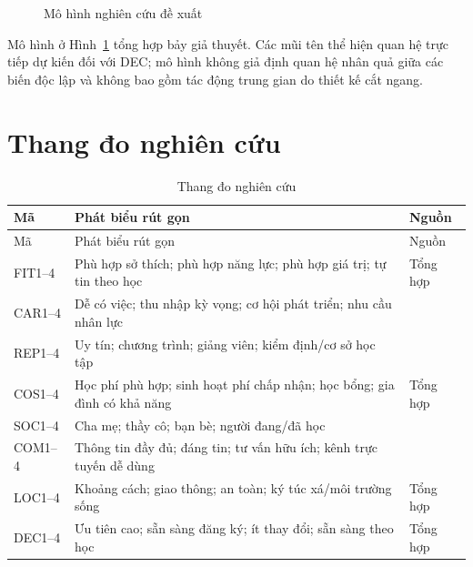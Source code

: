 \begin{figure}[H]\centering
{}
\caption{Mô hình nghiên cứu đề xuất}\label{fig:model}
\end{figure}

Mô hình ở Hình~\ref{fig:model} tổng hợp bảy giả thuyết. Các mũi tên thể hiện quan hệ trực tiếp dự kiến đối với DEC; mô hình không giả định quan hệ nhân quả giữa các biến độc lập và không bao gồm tác động trung gian do thiết kế cắt ngang.

\section{Thang đo nghiên cứu}
\begin{longtable}{p{1.5cm}p{9.3cm}p{2cm}}
\caption{Thang đo nghiên cứu}\label{tab:scale}\\\toprule Mã & Phát biểu rút gọn & Nguồn\\\midrule\endfirsthead
\toprule Mã & Phát biểu rút gọn & Nguồn\\\midrule\endhead
FIT1--4 & Phù hợp sở thích; phù hợp năng lực; phù hợp giá trị; tự tin theo học & Tổng hợp\\
CAR1--4 & Dễ có việc; thu nhập kỳ vọng; cơ hội phát triển; nhu cầu nhân lực & \citealp{becker1993}\\
REP1--4 & Uy tín; chương trình; giảng viên; kiểm định/cơ sở học tập & \citealp{chapman1981}\\
COS1--4 & Học phí phù hợp; sinh hoạt phí chấp nhận; học bổng; gia đình có khả năng & Tổng hợp\\
SOC1--4 & Cha mẹ; thầy cô; bạn bè; người đang/đã học & \citealp{ajzen1991}\\
COM1--4 & Thông tin đầy đủ; đáng tin; tư vấn hữu ích; kênh trực tuyến dễ dùng & \citealp{hossler1987}\\
LOC1--4 & Khoảng cách; giao thông; an toàn; ký túc xá/môi trường sống & Tổng hợp\\
DEC1--4 & Ưu tiên cao; sẵn sàng đăng ký; ít thay đổi; sẵn sàng theo học & Tổng hợp\\\bottomrule
\end{longtable}

